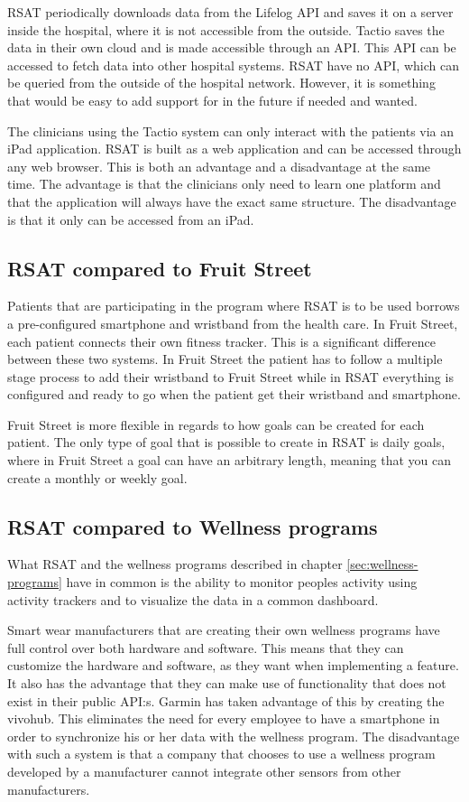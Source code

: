 \documentclass{cslthse-msc}
\begin{document}
RSAT periodically downloads data from the Lifelog API and saves it on a server inside the hospital, where it is not accessible from the outside. Tactio saves the data in their own cloud and is made accessible through an API. This API can be accessed to fetch data into other hospital systems. RSAT have no API, which can be queried from the outside of the hospital network. However, it is something that would be easy to add support for in the future if needed and wanted.  

The  clinicians using the Tactio system can only interact with the patients via an iPad application. RSAT is built as a web application and can be accessed through any web browser. This is both an advantage and a disadvantage at the same time. The advantage is that the clinicians only need to learn one platform and that the application will always have the exact same structure. The disadvantage is that it only can be accessed from an iPad.

\subsection{RSAT compared to Fruit Street}

Patients that are participating in the program where RSAT is to be used borrows a pre-configured smartphone and wristband from the health care. In Fruit Street, each patient connects their own fitness tracker. This is a significant difference between these two systems. In Fruit Street the patient has to follow a multiple stage process to add their wristband to Fruit Street  while in RSAT everything is configured and ready to go when the patient get their wristband and smartphone. 

Fruit Street is more flexible in regards to how goals can be created for each patient. The only type of goal that is possible to create in RSAT is daily goals, where in Fruit Street a goal can have an arbitrary length, meaning that you can create a monthly or weekly goal.

\subsection{RSAT compared to Wellness programs}

What RSAT and the wellness programs described in chapter \ref{sec:wellness-programs} have in common is the ability to monitor peoples activity using activity trackers and to visualize the data in a common dashboard. 

Smart wear manufacturers that are creating their own wellness programs have full control over both hardware and software. This means that they can customize the hardware and software, as they want when implementing a feature. It also has the advantage that they can make use of functionality that does not exist in their public API:s. Garmin has taken advantage of this by creating the vivohub. This eliminates the need for every employee to have a smartphone in order to synchronize his or her data with the wellness program. The disadvantage with such a system is that a company that chooses to use a wellness program developed by a manufacturer cannot integrate other sensors from other manufacturers. 
\end{document}
